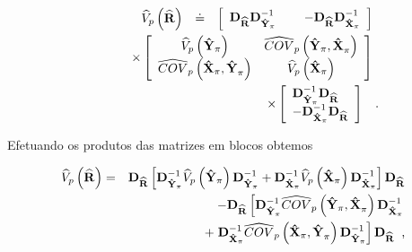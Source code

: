 \documentclass[]{book}
\numberwithin{example}{chapter}
\numberwithin{remark}{chapter}
\numberwithin{definition}{chapter}
\begin{document}
\begin{eqnarray*}
&& 
\begin{array}{lll}
\widehat{V}_{p}\left( \widehat{\mathbf{R}}\right) & \doteq & \left[ 
\begin{array}{lll}
\mathbf{\mathbf{D}_{\widehat{\mathbf{R}}}D}_{\mathbf{\hat{Y}}_{\pi }}^{-1} & 
\left. {}\right. & \mathbf{-\mathbf{D}_{\widehat{\mathbf{R}}}D}_{\mathbf{%
\hat{X}}_{\pi }}^{-1}
\end{array}
\right]
\end{array}
\\
&& 
\begin{array}{lll}
&  & \times \left[ 
\begin{array}{cc}
\widehat{V}_{p}\left( \mathbf{\hat{Y}}_{\pi }\right) & \widehat{COV}%
_{p}\left( \mathbf{\hat{Y}}_{\pi }\mathbf{,\hat{X}}_{\pi }\right) \\ 
\widehat{COV}_{p}\left( \mathbf{\hat{X}}_{\pi }\mathbf{,\hat{Y}}_{\pi
}\right) & \widehat{V}_{p}\left( \mathbf{\hat{X}}_{\pi }\right)
\end{array}
\right]
\end{array}
\\
&& 
\begin{array}{lll}
&  & \times \left[ 
\begin{array}{l}
\mathbf{D}_{\mathbf{\hat{Y}}_{\pi }}^{-1}\mathbf{\mathbf{D}_{\widehat{%
\mathbf{R}}}} \\ 
-\mathbf{D}_{\mathbf{\hat{X}}_{\pi }}^{-1}\mathbf{\mathbf{D}_{\widehat{%
\mathbf{R}}}}
\end{array}
\right]
\end{array}
\;\;.
\end{eqnarray*}

Efetuando os produtos das matrizes em blocos obtemos

\begin{eqnarray}
\widehat{V}_{p}\left( \widehat{\mathbf{R}}\right) &=&\mathbf{\mathbf{D}_{%
\widehat{\mathbf{R}}}}\left[ \mathbf{D}_{\mathbf{\hat{Y}}_{\pi }}^{-1}%
\widehat{V}_{p}\left( \mathbf{\hat{Y}}_{\pi }\right) \mathbf{D}_{\mathbf{%
\hat{Y}}_{\pi }}^{-1}+\mathbf{D}_{\mathbf{\hat{X}}_{\pi }}^{-1}\widehat{V}%
_{p}\left( \mathbf{\hat{X}}_{\pi }\right) \mathbf{D}_{\mathbf{\hat{X}}_{\pi
}}^{-1}\right] \mathbf{\mathbf{D}_{\widehat{\mathbf{R}}}}  \nonumber \\
&&-\mathbf{\mathbf{D}_{\widehat{\mathbf{R}}}}\left[ \mathbf{D}_{\mathbf{\hat{%
Y}}_{\pi }}^{-1}\widehat{COV}_{p}\left( \mathbf{\hat{Y}}_{\pi }\mathbf{,\hat{%
X}}_{\pi }\right) \mathbf{D}_{\mathbf{\hat{X}}_{\pi }}^{-1}\right.
\label{eq:estpa22} \\
&&+\left. \mathbf{D}_{\mathbf{\hat{X}}_{\pi }}^{-1}\widehat{COV}_{p}\left( 
\mathbf{\hat{X}}_{\pi }\mathbf{,\hat{Y}}_{\pi }\right) \mathbf{D}_{\mathbf{%
\hat{Y}}_{\pi }}^{-1}\right] \mathbf{\mathbf{D}_{\widehat{\mathbf{R}}}}\;\;%
\mbox{,}  \nonumber
\end{eqnarray}
\end{document}
